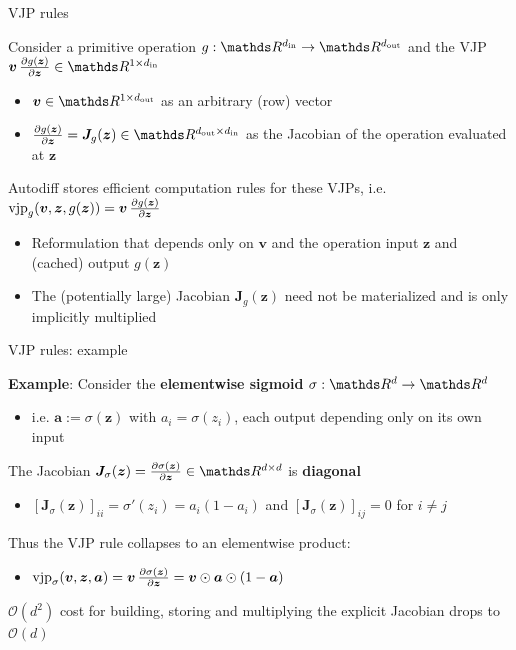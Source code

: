 \documentclass[11pt,compress,t,notes=noshow, xcolor=table]{beamer}
\newcommand{\zv}{\bm{z}}                 %
\begin{document}
\begin{framei}{VJP rules}
\item Consider a primitive operation $g: \R^{d_{\mathrm{in}}} \to \R^{d_{\mathrm{out}}}$ and the VJP $\bm{v} \, \pd{g(\zv)}{\zv} \in \R^{1 \times d_{\mathrm{in}}}$
\begin{itemize}
  \item $\bm{v} \in \R^{1 \times d_{\mathrm{out}}}$ as an arbitrary (row) vector
  \item $\pd{g(\zv)}{\zv}= \bm{J}_{g}(\zv) \in \R^{d_{\mathrm{out}} \times d_{\mathrm{in}}}$ as the Jacobian of the operation evaluated at $\zv$
\end{itemize}
\item Autodiff stores efficient computation rules for these VJPs, i.e. $\text{vjp}_g(\bm{v}, \zv, g(\zv))= \bm{v} \, \pd{g(\zv)}{\zv}$
\begin{itemize}
  \item Reformulation that depends only on $\bm{v}$ and the operation input $\zv$ and (cached) output $g(\zv)$
  \item[$\Rightarrow$] The (potentially large) Jacobian $\bm{J}_{g}(\zv)$ need not be materialized and is only implicitly multiplied
\end{itemize}
\end{framei}

\begin{framei}{VJP rules: example}
\item \textbf{Example}: Consider the \textbf{elementwise sigmoid} $\sigma: \R^{d} \to \R^{d}$
\begin{itemize}
  \item i.e. $\bm{a} := \sigma(\zv)$ with $a_i = \sigma(z_i)$, each output depending only on its own input
\end{itemize}
\item The Jacobian $\bm{J}_{\sigma}(\zv) = \pd{\sigma(\zv)}{\zv} \in \R^{d \times d}$ is \textbf{diagonal}
\begin{itemize}
\item $[\bm{J}_{\sigma}(\zv)]_{ii} = \sigma'(z_i) = a_i(1 - a_i)$ and $[\bm{J}_{\sigma}(\zv)]_{ij} = 0$ for $i \neq j$
\end{itemize}
%
\item Thus the VJP rule collapses to an elementwise product:
\begin{itemize}
\item $\text{vjp}_\sigma(\bm{v}, \zv, \bm{a}) = \bm{v} \, \pd{\sigma(\zv)}{\zv} = \bm{v} \odot \bm{a} \odot (1 - \bm{a})$
\end{itemize}
\item[$\Rightarrow$] $\mathcal{O}(d^2)$ cost for building, storing and multiplying the explicit Jacobian drops to $\mathcal{O}(d)$
\end{framei}
\end{document}
